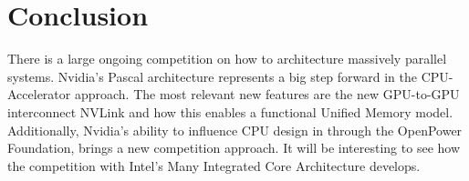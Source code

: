 
\section{Conclusion}
There is a large ongoing competition on how to architecture massively parallel systems.
Nvidia's Pascal architecture represents a big step forward in the CPU-Accelerator approach.
The most relevant new features are the new GPU-to-GPU interconnect NVLink and how this enables a functional Unified Memory model.
Additionally, Nvidia's ability to influence CPU design in through the OpenPower Foundation, brings a new competition approach.
It will be interesting to see how the competition with Intel's Many Integrated Core Architecture develops.
